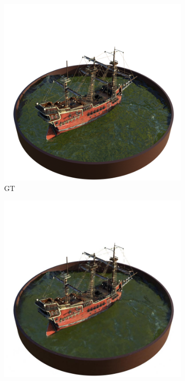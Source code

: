 \documentclass[12pt, a4paper, twoside]{book}
\numberwithin{equation}{chapter}
\numberwithin{theorem}{section}
\numberwithin{definition}{section}
\numberwithin{definitionChapter}{chapter}
\begin{document}
	\begin{figure}[H]
		\centering
		\begin{subfigure}{0.475\textwidth}
			\centering
			\includegraphics[scale=0.25]{img/gt/gt_ship_38.png}
			\caption{GT}
		\end{subfigure}
		\begin{subfigure}{0.475\textwidth}
			\centering
			\includegraphics[scale=0.25]{img/nerf/nerf_ship_38.jpg}

\end{subfigure}
\end{figure}
\end{document}
